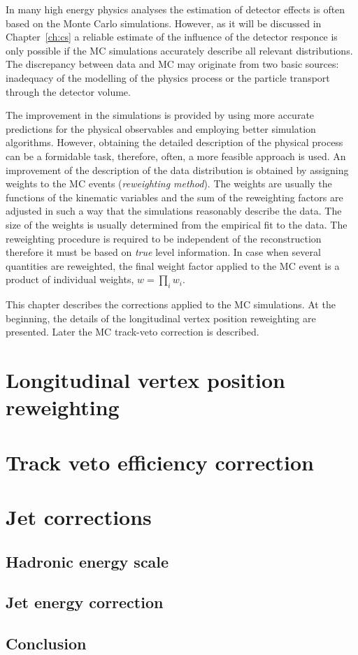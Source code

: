  In many high energy physics analyses the estimation of detector effects is often based on the Monte Carlo simulations. However, as it will be discussed in Chapter~\ref{ch:cs} a reliable estimate of the influence of the detector responce is only possible if the MC simulations accurately describe all relevant distributions. %
 The discrepancy between data and MC may originate from two basic sources: inadequacy of the modelling of the physics process or the particle transport through the detector volume.
 
 The improvement in the simulations is provided by using more accurate predictions for the physical observables and employing better simulation algorithms. However, obtaining the detailed description of the physical process can be a formidable task, therefore, often, a more feasible approach is used. An improvement of the description of the data distribution is obtained by assigning weights to the MC events (\emph{reweighting method}). The weights are usually the functions of the kinematic variables and the sum of the reweighting factors are adjusted in such a way that the simulations reasonably describe the data. The size of the weights is usually determined from the empirical fit to the data. The reweighting procedure is required to be independent of the reconstruction therefore it must be based on \emph{true} level information. In case when several quantities are reweighted, the final weight factor applied to the MC event is a product of individual weights, $w = \prod_i w_i$.
 
 This chapter describes the corrections applied to the MC simulations. At the beginning, the details of the longitudinal vertex position reweighting are presented. Later the MC track-veto correction is described.

 \section{Longitudinal vertex position reweighting}
 
 
 \section{Track veto efficiency correction}
 

 \newpage
 \section{Jet corrections}
 \subsection{Hadronic energy scale}
 \subsection{Jet energy correction}
% 

 \subsection{Conclusion}
\newpage
